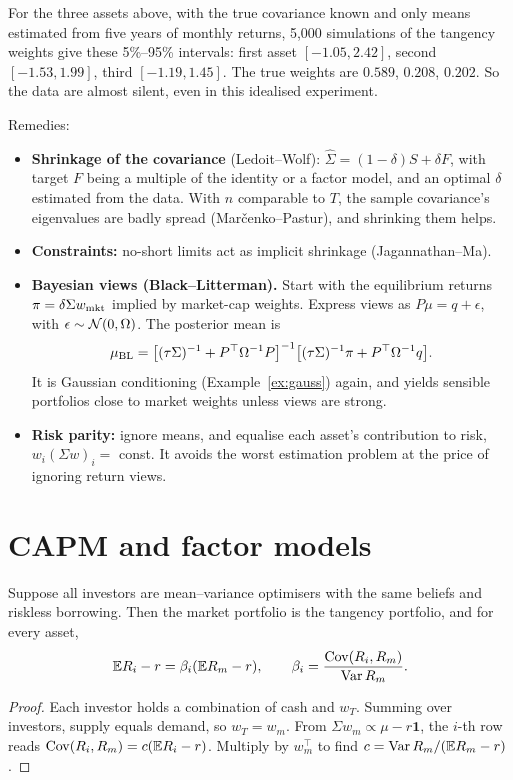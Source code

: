 \begin{numcheck}
For the three assets above, with the true covariance known and only means estimated from five years of monthly returns, 5{,}000 simulations of the tangency weights give these 5\%--95\% intervals: first asset $[-1.05,2.42]$, second $[-1.53,1.99]$, third $[-1.19,1.45]$. The true weights are $0.589$, $0.208$, $0.202$. So the data are almost silent, even in this idealised experiment.
\end{numcheck}

Remedies:
\begin{itemize}
\item \textbf{Shrinkage of the covariance} (Ledoit--Wolf): $\hat\Sigma=(1-\delta)S+\delta F$, with target $F$ being a multiple of the identity or a factor model, and an optimal $\delta$ estimated from the data. With $n$ comparable to $T$, the sample covariance's eigenvalues are badly spread (Mar\v{c}enko--Pastur), and shrinking them helps.
\item \textbf{Constraints:} no-short limits act as implicit shrinkage (Jagannathan--Ma).
\item \textbf{Bayesian views (Black--Litterman).} Start with the equilibrium returns $\pi=\delta\Sigma w_{\rm mkt}$ implied by market-cap weights. Express views as $P\mu=q+\epsilon$, with $\epsilon\sim\mathcal{N}(0,\Omega)$. The posterior mean is
\[
\mu_{\rm BL}=\bigl[(\tau\Sigma)^{-1}+P^\top\Omega^{-1}P\bigr]^{-1}\bigl[(\tau\Sigma)^{-1}\pi+P^\top\Omega^{-1}q\bigr].
\]
It is Gaussian conditioning (Example~\ref{ex:gauss}) again, and yields sensible portfolios close to market weights unless views are strong.
\item \textbf{Risk parity:} ignore means, and equalise each asset's contribution to risk, $w_i(\Sigma w)_i=$ const. It avoids the worst estimation problem at the price of ignoring return views.
\end{itemize}

\section{CAPM and factor models}

\begin{theorem}[CAPM]\label{thm:capm}
Suppose all investors are mean--variance optimisers with the same beliefs and riskless borrowing. Then the market portfolio is the tangency portfolio, and for every asset,
\[
\mathbb{E} R_i-r=\beta_i(\mathbb{E} R_m-r),\qquad\beta_i=\frac{\operatorname{Cov}(R_i,R_m)}{\operatorname{Var} R_m}.
\]
\end{theorem}
\begin{proof}
Each investor holds a combination of cash and $w_T$. Summing over investors, supply equals demand, so $w_T=w_m$. From $\Sigma w_m\propto\mu-r\mathbf{1}$, the $i$-th row reads $\operatorname{Cov}(R_i,R_m)=c(\mathbb{E} R_i-r)$. Multiply by $w_m^\top$ to find $c=\operatorname{Var} R_m/(\mathbb{E} R_m-r)$.
\end{proof}

